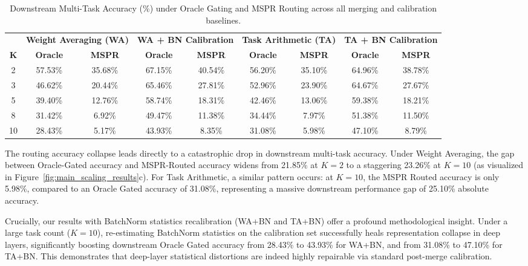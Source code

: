 \documentclass{article}
\theoremstyle{plain}
\theoremstyle{definition}
\theoremstyle{remark}
\begin{document}
\begin{table}[ht]
\centering
\caption{Downstream Multi-Task Accuracy (\%) under Oracle Gating and MSPR Routing across all merging and calibration baselines.}
\vskip 0.1in
\begin{tabular}{ccccccccc}
\toprule
 & \multicolumn{2}{c}{\textbf{Weight Averaging (WA)}} & \multicolumn{2}{c}{\textbf{WA + BN Calibration}} & \multicolumn{2}{c}{\textbf{Task Arithmetic (TA)}} & \multicolumn{2}{c}{\textbf{TA + BN Calibration}} \\
\textbf{K} & \textbf{Oracle} & \textbf{MSPR} & \textbf{Oracle} & \textbf{MSPR} & \textbf{Oracle} & \textbf{MSPR} & \textbf{Oracle} & \textbf{MSPR} \\
\midrule
2 & 57.53\% & 35.68\% & 67.15\% & 40.54\% & 56.20\% & 35.10\% & 64.96\% & 38.78\% \\
3 & 46.62\% & 20.44\% & 65.46\% & 27.81\% & 52.96\% & 23.90\% & 64.67\% & 27.67\% \\
5 & 39.40\% & 12.76\% & 58.74\% & 18.31\% & 42.46\% & 13.06\% & 59.38\% & 18.21\% \\
8 & 31.42\% & 6.92\% & 49.47\% & 11.38\% & 34.44\% & 7.97\% & 51.38\% & 11.50\% \\
10 & 28.43\% & 5.17\% & 43.93\% & 8.35\% & 31.08\% & 5.98\% & 47.10\% & 8.79\% \\
\bottomrule
\end{tabular}
\end{table}

The routing accuracy collapse leads directly to a catastrophic drop in downstream multi-task accuracy. Under Weight Averaging, the gap between Oracle-Gated accuracy and MSPR-Routed accuracy widens from 21.85\% at $K=2$ to a staggering 23.26\% at $K=10$ (as visualized in Figure~\ref{fig:main_scaling_results}c). For Task Arithmetic, a similar pattern occurs: at $K=10$, the MSPR Routed accuracy is only 5.98\%, compared to an Oracle Gated accuracy of 31.08\%, representing a massive downstream performance gap of 25.10\% absolute accuracy.

Crucially, our results with BatchNorm statistics recalibration (WA+BN and TA+BN) offer a profound methodological insight. Under a large task count ($K=10$), re-estimating BatchNorm statistics on the calibration set successfully heals representation collapse in deep layers, significantly boosting downstream Oracle Gated accuracy from 28.43\% to 43.93\% for WA+BN, and from 31.08\% to 47.10\% for TA+BN. This demonstrates that deep-layer statistical distortions are indeed highly repairable via standard post-merge calibration.
\end{document}
